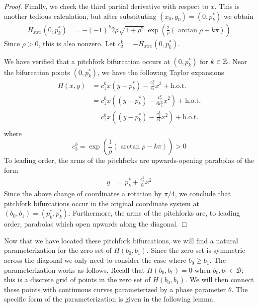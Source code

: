 \documentclass[thesis.tex]{subfiles}
\begin{document}
\begin{lemma}
\begin{proof}
Finally, we check the third partial derivative with respect to $x$. This is another tedious calculation, but after substituting $(x_0, y_0) = \left(0, p^*_k \right)$ we obtain
\begin{align*}
H_{xxx}(0, p_k^*)
&= -(-1)^k 2 \rho \sqrt{1 + \rho^2} \: \exp{\left(\frac{2}{\rho} (\arctan \rho - k \pi) \right)}
\end{align*}
Since $\rho > 0$, this is also nonzero. Let $c_2^k = -H_{xxx}(0, p^*_k)$.

We have verified that a pitchfork bifurcation occurs at $(0, p^*_k)$ for $k \in {\mathbb Z}$. Near the bifurcation points $(0, p_k^*)$, we have the following Taylor expansions
\begin{align*}
H(x, y) &= c_1^k x (y - p_k^*) - \frac{c_2^k}{6} x^3 + \text{h.o.t.} \\
&= c_1^k x \left( (y - p_k^*) - \frac{c_2^k}{6 c_1^k } x^2 \right) + \text{h.o.t.} \\
&= c_1^k x \left( (y - p_k^*) - \frac{c_3^k}{6} x^2 \right) + \text{h.o.t.} \\
\end{align*}
where
\begin{equation*}
c_3^k = \exp{\left(\frac{1}{\rho} (\arctan \rho - k \pi) \right)} > 0
\end{equation*}
To leading order, the arms of the pitchforks are upwards-opening parabolas of the form 
\begin{align*}
y &= p_k^* + \frac{c_3^k}{6} x^2
\end{align*}
Since the above change of coordinates a rotation by $\pi/4$, we conclude that pitchfork bifurcations occur in the original coordinate system at $(b_0, b_1) = (p_k^*, p_k^*)$. Furthermore, the arms of the pitchforks are, to leading order, parabolas which open upwards along the diagonal.
\end{proof}
\end{lemma}

Now that we have located these pitchfork bifurcations, we will find a natural parameterization for the zero set of $H(b_0, b_1)$. Since the zero set is symmetric across the diagonal we only need to consider the case where $b_0 \geq b_1$. The parameterization works as follows. Recall that $H(b_0, b_1) = 0$ when $b_0, b_1 \in \mathcal{B}$; this is a discrete grid of points in the zero set of $H(b_0, b_1)$. We will then connect these points with continuous curves parameterized by a phase parameter $\theta$. The specific form of the parameterization is given in the following lemma.
\end{document}
